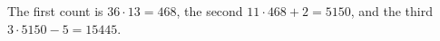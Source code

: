 The first count is $36\cdot13=468$, the second $11\cdot468+2=5150$, and the third $3\cdot5150-5=\boxed{15445}$.
